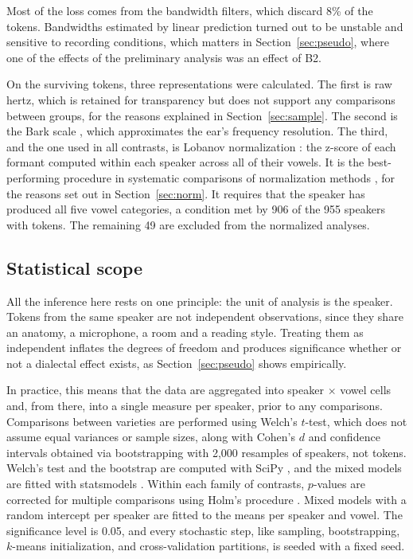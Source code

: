 \documentclass[11pt]{article}
\begin{document}
Most of the loss comes from the bandwidth filters, which discard 8\% of the
tokens. Bandwidths estimated by linear prediction turned out to be unstable and
sensitive to recording conditions, which matters in Section~\ref{sec:pseudo},
where one of the effects of the preliminary analysis was an effect of B2.

On the surviving tokens, three representations were calculated. The first is raw
hertz, which is retained for transparency but does not support any comparisons
between groups, for the reasons explained in Section~\ref{sec:sample}. The second
is the Bark scale \citep{traunmuller1990}, which approximates the ear's frequency
resolution. The third, and the one used in all contrasts, is Lobanov
normalization \citep{lobanov1971}: the z-score of each formant computed within
each speaker across all of their vowels. It is the best-performing procedure in
systematic comparisons of normalization methods \citep{adank2004}, for the
reasons set out in Section~\ref{sec:norm}. It requires that the speaker has
produced all five vowel categories, a condition met by 906 of the 955 speakers
with tokens. The remaining 49 are excluded from the normalized analyses.

\subsection{Statistical scope}

All the inference here rests on one principle: the unit of analysis is the
speaker. Tokens from the same speaker are not independent observations, since
they share an anatomy, a microphone, a room and a reading style. Treating them as
independent inflates the degrees of freedom and produces significance whether or
not a dialectal effect exists, as Section~\ref{sec:pseudo} shows empirically.

In practice, this means that the data are aggregated into speaker $\times$ vowel
cells and, from there, into a single measure per speaker, prior to any
comparisons. Comparisons between varieties are performed using Welch's $t$-test,
which does not assume equal variances or sample sizes, along with Cohen's $d$
\citep{cohen1988} and confidence intervals obtained via bootstrapping with 2,000
resamples of speakers, not tokens. Welch's test and the bootstrap are computed
with SciPy \citep{virtanen2020}, and the mixed models are fitted with statsmodels
\citep{seabold2010}. Within each family of contrasts, $p$-values are corrected
for multiple comparisons using Holm's procedure \citep{holm1979}. Mixed models
with a random intercept per speaker are fitted to the means per speaker and
vowel. The significance level is 0.05, and every stochastic step, like sampling,
bootstrapping, $k$-means initialization, and cross-validation partitions, is
seeded with a fixed seed.
\end{document}
